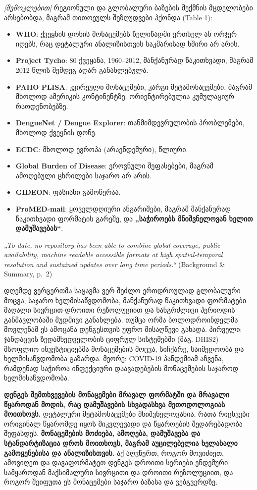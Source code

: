 \documentclass[11pt,a4paper]{article}
\newcommand{\imp}[1]{\textbf{\color{importred}#1}}
\begin{document}
\textit{[შემოკლებით]} რეგიონული და გლობალური ბაზების შექმნის მცდელობები არსებობდა, მაგრამ თითოეულს შეზღუდვები ჰქონდა (Table 1):
\begin{itemize}[leftmargin=1.5em]
  \item \textbf{WHO}: ქვეყნის დონის მონაცემებს წელიწადში ერთხელ ან ორჯერ იღებს, რაც დეტალური ანალიზისთვის საკმარისად ხშირი არ არის.
  \item \textbf{Project Tycho}: 80 ქვეყანა, 1960--2012, მანქანურად წაკითხვადი, მაგრამ 2012 წლის შემდეგ აღარ განახლებულა.
  \item \textbf{PAHO PLISA}: კვირეული მონაცემები, კარგი მეტამონაცემები, მაგრამ მხოლოდ ამერიკის კონტინენტზე. ორიენტირებულია კუმულაციურ რაოდენობებზე.
  \item \textbf{DengueNet / Dengue Explorer}: თანმიმდევრულობის პრობლემები, მხოლოდ ქვეყნის დონე.
  \item \textbf{ECDC}: მხოლოდ ევროპა (არაენდემური), წლიური.
  \item \textbf{Global Burden of Disease}: ეროვნული შეფასებები, მაგრამ ამოღებული ცხრილები საჯარო არ არის.
  \item \textbf{GIDEON}: ფასიანი გამოწერაა.
  \item \textbf{ProMED-mail}: ყოველდღიური ანგარიშები, მაგრამ მანქანურად წაკითხვადი ფორმატის გარეშე, და \imp{„საჭიროებს მნიშვნელოვან ხელით დამუშავებას“}.
\end{itemize}

\begin{citat}
\textit{„To date, no repository has been able to combine global coverage, public availability, machine readable accessible formats at high spatial-temporal resolution and sustained updates over long time periods.“} (Background \& Summary, p.~2)
\end{citat}

დღემდე ვერცერთმა საცავმა ვერ შეძლო ერთდროულად გლობალური მოცვა, საჯარო ხელმისაწვდომობა, მანქანურად წაკითხვადი ფორმატები მაღალი
სივრცით-დროითი რეზოლუციით და ხანგრძლივი პერიოდის განმავლობაში მუდმივი განახლება. თუმცა ორმა ბოლოდროინდელმა მოვლენამ ეს ამოცანა
დენგესთვის უფრო მისაღწევი გახადა. პირველი: ჯანდაცვის ზედამხედველობის ციფრულ სისტემებში (მაგ. DHIS2) მსოფლიო ინვესტიციებმა
მონაცემების მოცვა, სიჩქარე, საიმედოობა და ხელმისაწვდომობა გაზარდა. მეორე: COVID-19 პანდემიამ აჩვენა, რამდენად საჭიროა
ინფექციური დაავადებების მონაცემების საჯაროდ ხელმისაწვდომობა.

\imp{დენგეს შემთხვევების მონაცემები მრავალ ფორმატში და მრავალი წყაროდან მოდის, რაც დამუშავების სხვადასხვა მეთოდოლოგიას
მოითხოვს.} დეტალური მეტამონაცემები მნიშვნელოვანია, რათა რიცხვები ორიგინალ წყარომდე იყოს მიკვლევადი და წყაროების შედარებადობა
შეფასდეს. \imp{მონაცემების მოძიება, ამოღება, დამუშავება და სტანდარტიზაცია დროს მოითხოვს, მაგრამ აუცილებელია ხელახალი გამოყენებისა
და ანალიზისთვის.} აქ აღვწერთ, როგორ მოვიძიეთ, ამოვიღეთ და დავაფორმატეთ დენგეს დროითი სერიები ენდემური სამყაროდან მაქსიმალური
სივრცითი და დროითი რეზოლუციით, და როგორ შეიფუთა ეს მონაცემები საჯარო ბაზასა და ვებგვერდზე.
\end{document}
